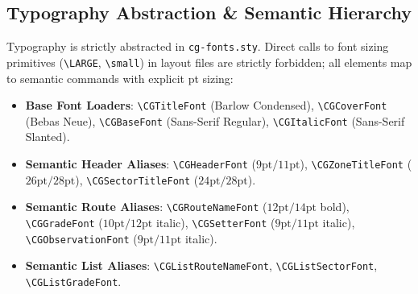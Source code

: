\subsection{Typography Abstraction \& Semantic Hierarchy}
Typography is strictly abstracted in \texttt{cg-fonts.sty}. Direct calls to font sizing primitives (\texttt{\textbackslash LARGE}, \texttt{\textbackslash small}) in layout files are strictly forbidden; all elements map to semantic commands with explicit pt sizing:
\begin{itemize}
    \item \textbf{Base Font Loaders}: \texttt{\textbackslash CGTitleFont} (Barlow Condensed), \texttt{\textbackslash CGCoverFont} (Bebas Neue), \texttt{\textbackslash CGBaseFont} (Sans-Serif Regular), \texttt{\textbackslash CGItalicFont} (Sans-Serif Slanted).
    \item \textbf{Semantic Header Aliases}: \texttt{\textbackslash CGHeaderFont} ($9\text{pt}/11\text{pt}$), \texttt{\textbackslash CGZoneTitleFont} ($26\text{pt}/28\text{pt}$), \texttt{\textbackslash CGSectorTitleFont} ($24\text{pt}/28\text{pt}$).
    \item \textbf{Semantic Route Aliases}: \texttt{\textbackslash CGRouteNameFont} ($12\text{pt}/14\text{pt}$ bold), \texttt{\textbackslash CGGradeFont} ($10\text{pt}/12\text{pt}$ italic), \texttt{\textbackslash CGSetterFont} ($9\text{pt}/11\text{pt}$ italic), \texttt{\textbackslash CGObservationFont} ($9\text{pt}/11\text{pt}$ italic).
    \item \textbf{Semantic List Aliases}: \texttt{\textbackslash CGListRouteNameFont}, \texttt{\textbackslash CGListSectorFont}, \texttt{\textbackslash CGListGradeFont}.
\end{itemize}
